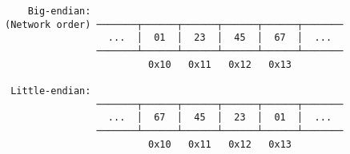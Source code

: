 \documentclass[varwidth=40em]{standalone}
\begin{document}
\begin{verbatim}
    Big-endian: 
(Network order) ───────┬──────┬──────┬──────┬──────┬───────
                  ...  │  01  │  23  │  45  │  67  │  ...  
                ───────┴──────┴──────┴──────┴──────┴───────
                         0x10   0x11   0x12   0x13         
                
 Little-endian: 
                ───────┬──────┬──────┬──────┬──────┬───────
                  ...  │  67  │  45  │  23  │  01  │  ...  
                ───────┴──────┴──────┴──────┴──────┴───────
                         0x10   0x11   0x12   0x13         
\end{verbatim}
\end{document}

